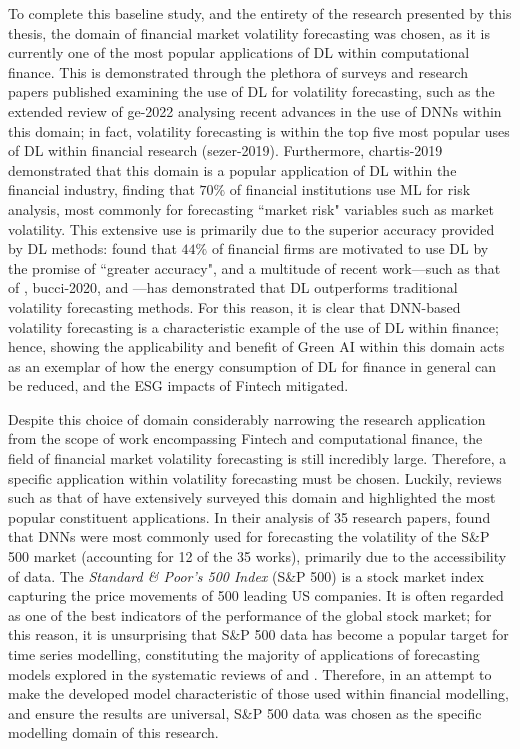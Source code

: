 \documentclass[a4paper, 11pt]{report}
\begin{document}
    To complete this baseline study, and the entirety of the research presented by this thesis, the domain of financial market volatility forecasting was chosen, as it is currently one of the most popular applications of DL within computational finance. This is demonstrated through the plethora of surveys and research papers published examining the use of DL for volatility forecasting, such as the extended review of ge-2022 analysing recent advances in the use of DNNs within this domain; in fact, volatility forecasting is within the top five most popular uses of DL within financial research (sezer-2019). Furthermore, chartis-2019 demonstrated that this domain is a popular application of DL within the financial industry, finding that $70\%$ of financial institutions use ML for risk analysis, most commonly for forecasting ``market risk" variables such as market volatility. This extensive use is primarily due to the superior accuracy provided by DL methods: \citet{chartis-2019} found that $44\%$ of financial firms are motivated to use DL by the promise of ``greater accuracy", and a multitude of recent work---such as that of \citet{rahimikia-2020}, bucci-2020, and \citet{rodikov-2022}---has demonstrated that DL outperforms traditional volatility forecasting methods. For this reason, it is clear that DNN-based volatility forecasting is a characteristic example of the use of DL within finance; hence, showing the applicability and benefit of Green AI within this domain acts as an exemplar of how the energy consumption of DL for finance in general can be reduced, and the ESG impacts of Fintech mitigated.

    Despite this choice of domain considerably narrowing the research application from the scope of work encompassing Fintech and computational finance, the field of financial market volatility forecasting is still incredibly large. Therefore, a specific application within volatility forecasting must be chosen. Luckily, reviews such as that of \citet{ge-2022} have extensively surveyed this domain and highlighted the most popular constituent applications. In their analysis of 35 research papers, \citet{ge-2022} found that DNNs were most commonly used for forecasting the volatility of the S\&P 500 market (accounting for 12 of the 35 works), primarily due to the accessibility of data. The \emph{Standard \& Poor's 500 Index} (S\&P 500) is a stock market index capturing the price movements of 500 leading US companies. It is often regarded as one of the best indicators of the performance of the global stock market; for this reason, it is unsurprising that S\&P 500 data has become a popular target for time series modelling, constituting the majority of applications of forecasting models explored in the systematic reviews of \citet{sezer-2019} and \citet{thakkar-2021}. Therefore, in an attempt to make the developed model characteristic of those used within financial modelling, and ensure the results are universal, S\&P 500 data was chosen as the specific modelling domain of this research. 
\end{document}
